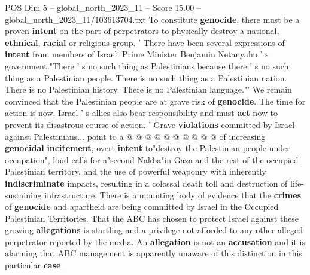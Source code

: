 \begin{textsample}{POS Dim 5 – global\_north\_2023\_11 – Score 15.00 – global\_north\_2023\_11/103613704.txt}
To constitute \textbf{genocide}, there must be a proven \textbf{intent} on the part of perpetrators to physically destroy a national, \textbf{ethnical}, \textbf{racial} or religious group. ' There have been several expressions of \textbf{intent} from members of Israeli Prime Minister Benjamin Netanyahu ' s government."There ' s no such thing as Palestinians because there ' s no such thing as a Palestinian people.
There is no such thing as a Palestinian nation.
There is no Palestinian history.
There is no Palestinian language."' We remain convinced that the Palestinian people are at grave risk of \textbf{genocide}.
The time for action is now.
Israel ' s allies also bear responsibility and must \textbf{act} now to prevent its disastrous course of action. ' Grave \textbf{violations} committed by Israel against Palestinians... point to a @ @ @ @ @ @ @ @ @ @ of increasing \textbf{genocidal} \textbf{incitement}, overt \textbf{intent} to"destroy the Palestinian people under occupation", loud calls for a"second Nakba"in Gaza and the rest of the occupied Palestinian territory, and the use of powerful weaponry with inherently \textbf{indiscriminate} impacts, resulting in a colossal death toll and destruction of life-sustaining infrastructure.
There is a mounting body of evidence that the \textbf{crimes} of \textbf{genocide} and apartheid are being committed by Israel in the Occupied Palestinian Territories.
That the ABC has chosen to protect Israel against these growing \textbf{allegations} is startling and a privilege not afforded to any other alleged perpetrator reported by the media.
An \textbf{allegation} is not an \textbf{accusation} and it is alarming that ABC management is apparently unaware of this distinction in this particular \textbf{case}.

\end{textsample}

